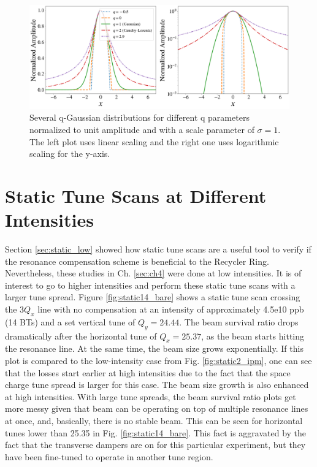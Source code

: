 \begin{figure}[H]
    \centering
    \includegraphics[width=\textwidth,keepaspectratio]{chapter6/qgaussians.png}
    \caption{Several q-Gaussian distributions for different q parameters normalized to unit amplitude and with a scale parameter of $\sigma=1$. The left plot uses linear scaling and the right one uses logarithmic scaling for the y-axis.}
    \label{fig:qgaussians}
\end{figure}


\section{\label{sec:static_high}Static Tune Scans at Different Intensities}

Section \ref{sec:static_low} showed how static tune scans are a useful tool to verify if the resonance compensation scheme is beneficial to the Recycler Ring. Nevertheless, these studies in Ch. \ref{sec:ch4} were done at low intensities. It is of interest to go to higher intensities and perform these static tune scans with a larger tune spread. Figure \ref{fig:static14_bare} shows a static tune scan crossing the $3Q_x$ line with no compensation at an intensity of approximately 4.5e10 ppb (14 BTs) and a set vertical tune of $Q_y=24.44$. The beam survival ratio drops dramatically after the horizontal tune of $Q_x=25.37$, as the beam starts hitting the resonance line. At the same time, the beam size grows exponentially. If this plot is compared to the low-intensity case from Fig. \ref{fig:static2_ipm}, one can see that the losses start earlier at high intensities due to the fact that the space charge tune spread is larger for this case. The beam size growth is also enhanced at high intensities. With large tune spreads, the beam survival ratio plots get more messy given that beam can be operating on top of multiple resonance lines at once, and, basically, there is no stable beam. This can be seen for horizontal tunes lower than 25.35 in Fig. \ref{fig:static14_bare}. This fact is aggravated by the fact that the transverse dampers are on for this particular experiment, but they have been fine-tuned to operate in another tune region. 


